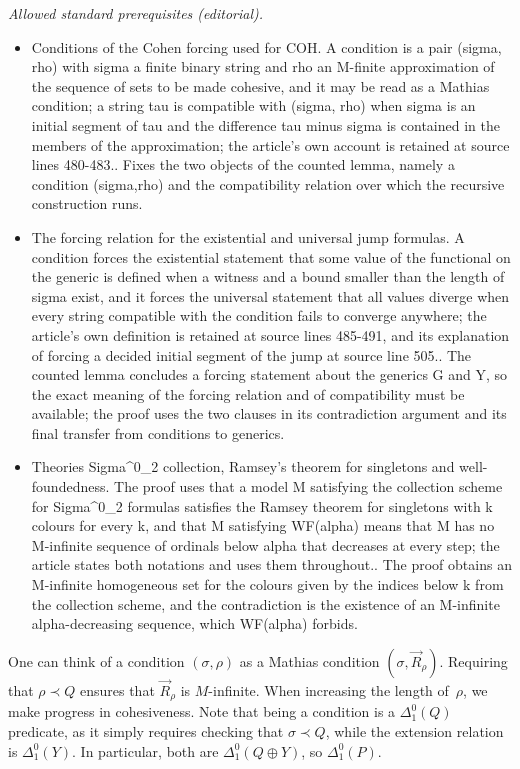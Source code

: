 \documentclass{article}
\numberwithin{theorem}{section}
\begin{document}
\noindent\textit{Allowed standard prerequisites (editorial).}\begin{itemize}
\item Conditions of the Cohen forcing used for COH. A condition is a pair (sigma, rho) with sigma a finite binary string and rho an M-finite approximation of the sequence of sets to be made cohesive, and it may be read as a Mathias condition; a string tau is compatible with (sigma, rho) when sigma is an initial segment of tau and the difference tau minus sigma is contained in the members of the approximation; the article's own account is retained at source lines 480-483.. Fixes the two objects of the counted lemma, namely a condition (sigma,rho) and the compatibility relation over which the recursive construction runs.
\item The forcing relation for the existential and universal jump formulas. A condition forces the existential statement that some value of the functional on the generic is defined when a witness and a bound smaller than the length of sigma exist, and it forces the universal statement that all values diverge when every string compatible with the condition fails to converge anywhere; the article's own definition is retained at source lines 485-491, and its explanation of forcing a decided initial segment of the jump at source line 505.. The counted lemma concludes a forcing statement about the generics G and Y, so the exact meaning of the forcing relation and of compatibility must be available; the proof uses the two clauses in its contradiction argument and its final transfer from conditions to generics.
\item Theories Sigma\textasciicircum{}0\_2 collection, Ramsey's theorem for singletons and well-foundedness. The proof uses that a model M satisfying the collection scheme for Sigma\textasciicircum{}0\_2 formulas satisfies the Ramsey theorem for singletons with k colours for every k, and that M satisfying WF(alpha) means that M has no M-infinite sequence of ordinals below alpha that decreases at every step; the article states both notations and uses them throughout.. The proof obtains an M-infinite homogeneous set for the colours given by the indices below k from the collection scheme, and the contradiction is the existence of an M-infinite alpha-decreasing sequence, which WF(alpha) forbids.
\end{itemize}\medskip
One can think of a condition $(\sigma, \rho)$ as a Mathias condition $(\sigma, \vec{R}_\rho)$. Requiring that $\rho \prec Q$ ensures that $\vec{R}_\rho$ is $M$-infinite. When increasing the length of~$\rho$, we make progress in cohesiveness.
Note that being a condition is a $\Delta^0_1(Q)$ predicate, as it simply requires checking that $\sigma \prec Q$, while the extension relation is $\Delta^0_1(Y)$. In particular, both are $\Delta^0_1(Q \oplus Y)$, so $\Delta^0_1(P)$.
\end{document}
